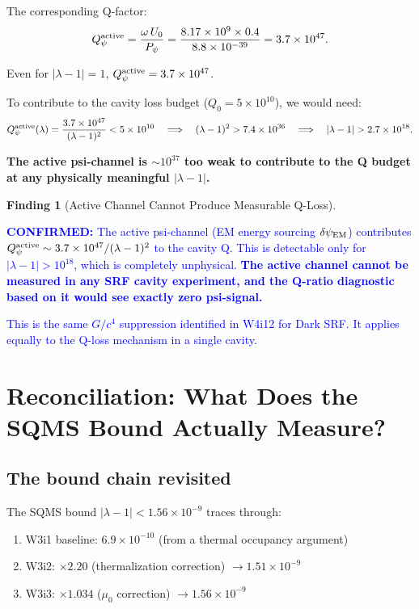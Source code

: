 \documentclass[11pt]{article}
\newcommand{\lam}{\lambda}
\newcommand{\lbone}{|\lambda - 1|}
\newcommand{\Qpsi}{Q_\psi}
\newcommand{\ee}[1]{\times 10^{#1}}
\newcommand{\dpsiEM}{\delta\psi_{\rm EM}}
\newcommand{\confirmed}[1]{\textcolor{blue}{\textbf{CONFIRMED:} #1}}
\theoremstyle{definition}
\newtheorem{finding}[theorem]{Finding}
\theoremstyle{remark}
\begin{document}
The corresponding Q-factor:
\begin{equation}
\Qpsi^{\rm active} = \frac{\omega\,U_0}{P_\psi}
= \frac{8.17\ee{9}\times 0.4}{8.8\ee{-39}}
= 3.7\ee{47}.
\label{eq:Q_psi_active}
\end{equation}

Even for $\lbone = 1$, $\Qpsi^{\rm active} = 3.7\ee{47}$.

To contribute to the cavity loss budget ($Q_0 = 5\ee{10}$), we would
need:
\begin{equation}
\Qpsi^{\rm active}(\lam) = \frac{3.7\ee{47}}{(\lam-1)^2} < 5\ee{10}
\quad\Longrightarrow\quad
(\lam-1)^2 > 7.4\ee{36}
\quad\Longrightarrow\quad
\lbone > 2.7\ee{18}.
\end{equation}

\textbf{The active psi-channel is $\sim 10^{37}$ too weak to contribute
to the Q budget at any physically meaningful $\lbone$.}

\begin{finding}[Active Channel Cannot Produce Measurable Q-Loss]
\label{find:active_dead}
\confirmed{The active psi-channel (EM energy sourcing $\dpsiEM$)
contributes $\Qpsi^{\rm active} \sim 3.7\ee{47}/(\lam-1)^2$ to the
cavity Q. This is detectable only for $\lbone > 10^{18}$, which is
completely unphysical. \textbf{The active channel cannot be measured
in any SRF cavity experiment, and the Q-ratio diagnostic based on
it would see exactly zero psi-signal.}

This is the same $G/c^4$ suppression identified in W4i12 for Dark SRF.
It applies equally to the Q-loss mechanism in a single cavity.}
\end{finding}


\section{Reconciliation: What Does the SQMS Bound Actually Measure?}
\label{sec:reconciliation}

\subsection{The bound chain revisited}

The SQMS bound $\lbone < 1.56\ee{-9}$ traces through:
\begin{enumerate}[nosep]
\item W3i1 baseline: $6.9\ee{-10}$ (from a thermal occupancy argument)
\item W3i2: $\times 2.20$ (thermalization correction) $\to 1.51\ee{-9}$
\item W3i3: $\times 1.034$ ($\mu_0$ correction) $\to 1.56\ee{-9}$
\end{enumerate}
\end{document}
